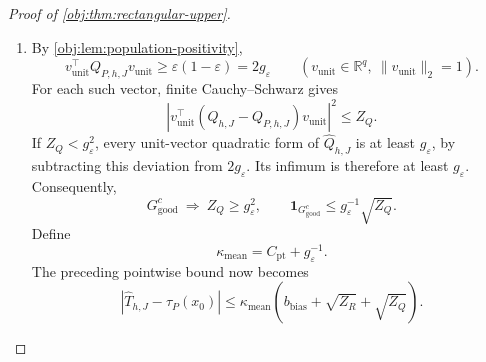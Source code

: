 \begin{proof}[Proof of \cref{obj:thm:rectangular-upper}]
\begin{enumerate}
The inverse identity and the residual decomposition are
\[
\widehat Q_{h,J}^{-1}\widehat R_{h,J}-\vartheta
=
\widehat Q_{h,J}^{-1}
 (\widehat R_{h,J}-\widehat Q_{h,J}\vartheta),
\]
\[
\widehat R_{h,J}-\widehat Q_{h,J}\vartheta
=
(\widehat R_{h,J}-\bar R)
+(\bar R-Q_{P,h,J}\vartheta)
+(Q_{P,h,J}-\widehat Q_{h,J})\vartheta.
\]
The triangle inequality and rowwise Cauchy--Schwarz imply
\[
\|\widehat R_{h,J}-\widehat Q_{h,J}\vartheta\|_2
\le
\sqrt{Z_R}
+C_{\mathrm{bias}}b_{\mathrm{bias}}
+C_{\mathrm{loc}}\sqrt{Z_Q}.
\]
Because both arm means lie in \([0,1]\),
\[
\tau_P(x_0)\in[-1,1].
\]
Clipping toward this interval decreases absolute error: below its lower endpoint the clipped endpoint lies between the value and the target, above its upper endpoint the same holds, and inside the interval clipping preserves the value. Thus, on \(G_{\mathrm{good}}\),
\[
\begin{aligned}
|\widehat T_{h,J}-\tau_P(x_0)|
&\le g_\varepsilon^{-1}\|r_0\|_2
 \|\widehat R_{h,J}-\widehat Q_{h,J}\vartheta\|_2\\
&\le g_\varepsilon^{-1}C_{\mathrm{loc}}
 \left(\sqrt{Z_R}
 +C_{\mathrm{bias}}b_{\mathrm{bias}}
 +C_{\mathrm{loc}}\sqrt{Z_Q}\right).
\end{aligned}
\]
Define the positive finite constant
\[
C_{\mathrm{pt}}
=g_\varepsilon^{-1}C_{\mathrm{loc}}
 (1+C_{\mathrm{bias}}+C_{\mathrm{loc}}).
\]
All three coefficients in the preceding parentheses are at most
\(1+C_{\mathrm{bias}}+C_{\mathrm{loc}}\). On the complementary event the decision is zero and its error is at most \(1\). Combining these branches gives, on every sample,
\[
|\widehat T_{h,J}-\tau_P(x_0)|
\le
C_{\mathrm{pt}}
 (b_{\mathrm{bias}}+\sqrt{Z_R}+\sqrt{Z_Q})
+\mathbf1_{G_{\mathrm{good}}^c}.
\]%

\item By \cref{obj:lem:population-positivity},
\[
v_{\mathrm{unit}}^\top Q_{P,h,J}v_{\mathrm{unit}}
\ge\varepsilon(1-\varepsilon)=2g_\varepsilon
\qquad
(v_{\mathrm{unit}}\in\mathbb R^q,\ \|v_{\mathrm{unit}}\|_2=1).
\]
For each such vector, finite Cauchy--Schwarz gives
\[
\left|
v_{\mathrm{unit}}^\top
(\widehat Q_{h,J}-Q_{P,h,J})v_{\mathrm{unit}}
\right|^2
\le Z_Q.
\]
If \(Z_Q<g_\varepsilon^2\), every unit-vector quadratic form of
\(\widehat Q_{h,J}\) is at least \(g_\varepsilon\), by subtracting this deviation from \(2g_\varepsilon\). Its infimum is therefore at least \(g_\varepsilon\). Consequently,
\[
G_{\mathrm{good}}^c
\ \Longrightarrow\
Z_Q\ge g_\varepsilon^2,
\qquad
\mathbf1_{G_{\mathrm{good}}^c}
\le g_\varepsilon^{-1}\sqrt{Z_Q}.
\]
Define
\[
\kappa_{\mathrm{mean}}=C_{\mathrm{pt}}+g_\varepsilon^{-1}.
\]
The preceding pointwise bound now becomes
\[
|\widehat T_{h,J}-\tau_P(x_0)|
\le
\kappa_{\mathrm{mean}}
 (b_{\mathrm{bias}}+\sqrt{Z_R}+\sqrt{Z_Q}).
\]


\end{enumerate}
\end{proof}
